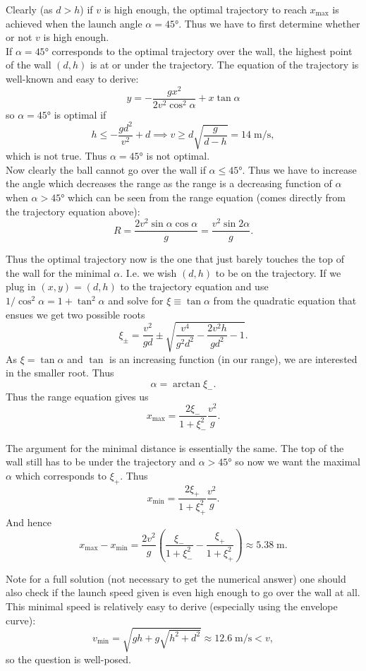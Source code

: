 \begin{solution}
Clearly (as $d>h$) if $v$ is high enough, the optimal trajectory to reach $x_{\max}$ is achieved when the launch angle $\alpha=\ang{45}$. Thus we have to first determine whether or not $v$ is high enough.\\

If $\alpha=\ang{45}$ corresponds to the optimal trajectory over the wall, the highest point of the wall $(d,h)$ is at or under the trajectory. The equation of the trajectory is well-known and easy to derive:
\[y=-\frac{gx^2}{2v^2\cos^2\alpha}+x\tan\alpha\]
so $\alpha=\ang{45}$ is optimal if
\[h\leq -\frac{gd^2}{v^2}+d \implies v\geq d\sqrt{\frac{g}{d-h}}=14\;\mathrm{m/s},\]
which is not true. Thus $\alpha=\ang{45}$ is not optimal.\\

Now clearly the ball cannot go over the wall if $\alpha\leq\ang{45}$. Thus we have to increase the angle which decreases the range as the range is a decreasing function of $\alpha$ when $\alpha>\ang{45}$ which can be seen from the range equation (comes directly from the trajectory equation above):
\[R=\frac{2v^2\sin\alpha\cos\alpha}{g}=\frac{v^2\sin2\alpha}{g}.\]

Thus the optimal trajectory now is the one that just barely touches the top of the wall for the minimal $\alpha$. I.e. we wish $(d,h)$ to be on the trajectory. If we plug in $(x,y)=(d,h)$ to the trajectory equation and use $1/\cos^2\alpha=1+\tan^2\alpha$ and solve for $\xi\equiv\tan\alpha$ from the quadratic equation that ensues we get two possible roots
\[\xi_{\pm}=\frac{v^2}{gd}\pm\sqrt{\frac{v^4}{g^2d^2}-\frac{2v^2h}{gd^2}-1}.\]
As $\xi=\tan\alpha$ and $\tan$ is an increasing function (in our range), we are interested in the smaller root. Thus
\[\alpha=\arctan{\xi_-}.\]
Thus the range equation gives us
\[x_{\max}=\frac{2\xi_-}{1+\xi_-^2}\frac{v^2}{g}.\]

The argument for the minimal distance is essentially the same. The top of the wall still has to be under the trajectory and $\alpha>\ang{45}$ so now we want the maximal $\alpha$ which corresponds to $\xi_+.$ Thus
\[x_{\min}=\frac{2\xi_+}{1+\xi_+^2}\frac{v^2}{g}.\]
And hence
\[x_{\max}-x_{\min}=\frac{2v^2}{g}\left(\frac{\xi_-}{1+\xi_-^2}-\frac{\xi_+}{1+\xi_+^2}\right)\approx\boxed{5.38\;\mathrm{m}}.\]

Note for a full solution (not necessary to get the numerical answer) one should also check if the launch speed given is even high enough to go over the wall at all. This minimal speed is relatively easy to derive (especially using the envelope curve):
\[v_{\min}=\sqrt{gh+g\sqrt{h^2+d^2}}\approx{12.6}\;\mathrm{m/s}<v,\]
so the question is well-posed.
\end{solution}